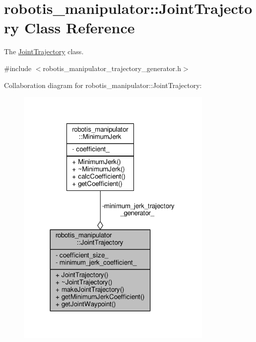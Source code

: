 \hypertarget{classrobotis__manipulator_1_1_joint_trajectory}{}\section{robotis\+\_\+manipulator\+:\+:Joint\+Trajectory Class Reference}
\label{classrobotis__manipulator_1_1_joint_trajectory}


The \hyperlink{classrobotis__manipulator_1_1_joint_trajectory}{Joint\+Trajectory} class.  




{\ttfamily \#include $<$robotis\+\_\+manipulator\+\_\+trajectory\+\_\+generator.\+h$>$}



Collaboration diagram for robotis\+\_\+manipulator\+:\+:Joint\+Trajectory\+:\nopagebreak
\begin{figure}[H]
\begin{center}
\leavevmode
\includegraphics[width=269pt]{classrobotis__manipulator_1_1_joint_trajectory__coll__graph}
\end{center}
\end{figure}
